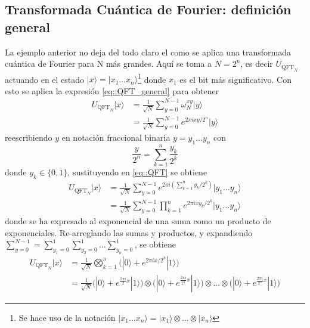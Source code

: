 \documentclass[a4paper]{article}
\begin{document}
\subsection{Transformada Cuántica de Fourier: definición general}
La ejemplo anterior no deja del todo claro el como se aplica una transformada cuántica de Fourier para N más grandes. Aquí se toma a $N=2^n$, es decir $U_{\text{QFT}_N}$ actuando en el estado $|x\rangle=|x_1\hdots x_n\rangle$\footnote{Se hace uso de la notación $|x_1\hdots x_n\rangle=|x_1\rangle\otimes\hdots\otimes |x_n\rangle$ } donde $x_1$ es el bit más significativo. Con esto se aplica la expresión \ref{eq::QFT_general} para obtener
\begin{equation}\label{eq::QFT}
\begin{aligned}
U_{\text{QFT}_N}|x\rangle &=\frac{1}{\sqrt{N}}\sum_{y=0}^{N-1}\omega_N^{xy}|y\rangle\\
&=\frac{1}{\sqrt{N}}\sum_{y=0}^{N-1} e^{2\pi i xy/2^{n}}|y\rangle
\end{aligned}
\end{equation}
reescribiendo $y$ en notación fraccional binaria $y=y_1\hdots y_n$ con
\begin{equation*}
\frac{y}{2^n}=\sum_{k=1}^{n}\frac{y_k}{2^k}
\end{equation*}
donde $y_k \in\{ 0, 1 \}$, sustituyendo en \ref{eq::QFT} se obtiene
\begin{equation}\label{eq::QFT_2}
\begin{aligned}
U_{\text{QFT}_N}|x\rangle &=\frac{1}{\sqrt{N}}\sum_{y=0}^{N-1}e^{2\pi i(\sum_{k=1}^n y_k/2^k)}|y_1 \hdots y_n\rangle\\
&=\frac{1}{\sqrt{N}}\sum_{y=0}^{N-1} \prod_{k=1}^n e^{2\pi i x y_k/2^{k}}|y_1 \hdots y_n\rangle
\end{aligned}
\end{equation}
donde se ha expresado al exponencial de una suma como un producto de exponenciales. Re-arreglando las sumas y productos, y expandiendo $\sum_{y=0}^{N-1}=\sum_{y_1=0}^1 \sum_{y_2=0}^1 \hdots \sum_{y_n=0}^1$, se obtiene
\begin{equation}\label{eq::QFT_3}
\begin{aligned}
U_{\text{QFT}_N}|x\rangle &=\frac{1}{\sqrt{N}} \bigotimes_{k=1}^n \bigg(|0\rangle + e^{2\pi i x/2^k}|1\rangle \bigg)  \\
&=\frac{1}{\sqrt{N}}\bigg(|0\rangle + e^{\frac{2\pi i}{2} x} |1\rangle \bigg)\otimes\bigg(|0\rangle + e^{\frac{2\pi i}{2^2} x} |1\rangle \bigg)\otimes \hdots \otimes \bigg(|0\rangle + e^{\frac{2\pi i}{2^{n}} x} |1\rangle \bigg)
\end{aligned}
\end{equation}
\end{document}
